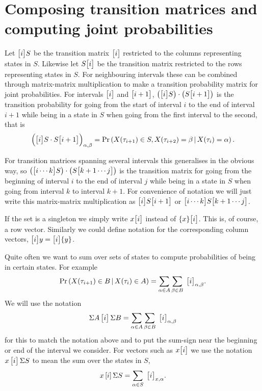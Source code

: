 \section{Composing transition matrices and computing joint probabilities}

Let $\mathbf{\big[}i\mathbf{\big]}S$ be the transition matrix $\mathbf{\big[}i\mathbf{\big]}$ restricted to the columns representing states in $S$. Likewise let $S\mathbf{\big[}i\mathbf{\big]}$ be the transition matrix restricted to the rows representing states in $S$. For neighbouring intervals these can be combined through matrix-matrix multiplication to make a transition probability matrix for joint probabilities. For intervals $\mathbf{\big[}i\mathbf{\big]}$ and $\mathbf{\big[}i+1\mathbf{\big]}$, $\left(\mathbf{\big[}i\mathbf{\big]} S\right) \cdot \left(S\mathbf{\big[}i+1\mathbf{\big]}\right)$ is the transition probability for going from the start of interval $i$ to the end of interval $i+1$ while being in a state in $S$ when going from the first interval to the second, that is 
\[
\Big(\mathbf{\big[}i\mathbf{\big]} S \cdot S\mathbf{\big[}i+1\mathbf{\big]}\Big)_{\alpha,\beta} 
    = \Pr\left(X(\tau_{i+1})\in S, X(\tau_{i+2})=\beta \,|\, X(\tau_i)=\alpha \right)
 .
\]

For transition matrices spanning several intervals this generalises in the obvious way, so $\left(\mathbf{\big[}i\cdots k\mathbf{\big]} S\right) \cdot \left( S\mathbf{\big[}k+1\cdots j\mathbf{\big]}\right)$ is the transition matrix for going from the beginning of interval $i$ to the end of interval $j$ while being in a state in $S$ when going from interval $k$ to interval $k+1$. For convenience of notation we will just write this matrix-matrix multiplication as $\mathbf{\big[}i\mathbf{\big]}S\mathbf{\big[}i+1\mathbf{\big]}$ or $\mathbf{\big[}i\cdots k\mathbf{\big]}S\mathbf{\big[}k+1\cdots j\mathbf{\big]}$.

If the set is a singleton we simply write $x\mathbf{\big[}i\mathbf{\big]}$ instead of $\{x\}\mathbf{\big[}i\mathbf{\big]}$. This is, of course, a row vector. Similarly we could define notation for the corresponding column vectors, $\mathbf{\big[}i\mathbf{\big]}y=\mathbf{\big[}i\mathbf{\big]}\{y\}$.

Quite often we want to sum over sets of states to compute probabilities of being in certain states. For example
\[
    \Pr\left(X(\tau_{i+1})\in B \,|\, X(\tau_i)\in A \right)
     = \sum_{\alpha\in A} \sum_{\beta \in B}\; \mathbf{\big[}i\mathbf{\big]}_{\alpha,\beta}
    .
\]
We will use the notation
\[
    {\Sigma A}\,\mathbf{\big[}i\mathbf{\big]}\,{\Sigma B}
     = \sum_{\alpha\in A} \sum_{\beta \in B}\; \mathbf{\big[}i\mathbf{\big]}_{\alpha,\beta}
\]
for this to match the notation above and to put the sum-sign near the beginning or end of the interval we consider. For vectors such as $x\mathbf{\big[}i\mathbf{\big]}$ we use the notation $x\,\mathbf{\big[}i\mathbf{\big]}\,{\Sigma S}$ to mean the sum over the states in $S$, 
\[
    x\,[i]\,{\Sigma S} = \sum_{\alpha\in S} \; \mathbf{\big[}i\mathbf{\big]}_{x,\alpha}
    .
\]

